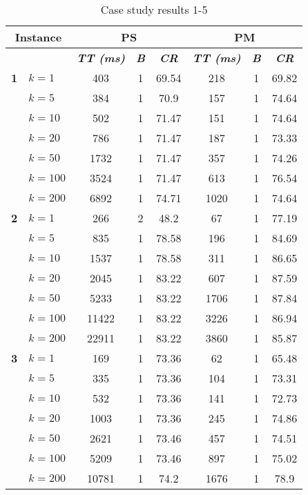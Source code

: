     \begin{table}[htbp]
    \caption{Case study results 1-5}
    \centering
    \begin{tabular}{|l|l|c|c|c|c|c|c|}
    \hline
    \multicolumn{ 2}{|c|}{\textbf{Instance}} & \multicolumn{ 3}{c|}{\textbf{PS}} & \multicolumn{ 3}{c|}{\textbf{PM}} \\ \hline
    \multicolumn{ 2}{|l|}{} & \textbf{\textit{TT (ms)}} & \textbf{\textit{B}} & \textbf{\textit{CR}} & \textbf{\textit{TT (ms)}} & \textbf{\textit{B}} & \textbf{\textit{CR}} \\ \hline
    \multicolumn{1}{|r|}{\textbf{1}} & $k=1$ & 403 & 1 & 69.54 & 218 & 1 & 69.82 \\ 
     & $k=5$ & 384 & 1 & 70.9 & 157 & 1 & 74.64 \\ 
     & $k=10$ & 502 & 1 & 71.47 & 151 & 1 & 74.64 \\ 
     & $k=20$ & 786 & 1 & 71.47 & 187 & 1 & 73.33 \\ 
     & $k=50$ & 1732 & 1 & 71.47 & 357 & 1 & 74.26 \\ 
     & $k=100$ & 3524 & 1 & 71.47 & 613 & 1 & 76.54 \\ 
     & $k=200$ & 6892 & 1 & 74.71 & 1020 & 1 & 74.64 \\ \hline
    \multicolumn{1}{|r|}{\textbf{2}} & $k=1$ & 266 & 2 & 48.2 & 67 & 1 & 77.19 \\ 
     & $k=5$ & 835 & 1 & 78.58 & 196 & 1 & 84.69 \\ 
     & $k=10$ & 1537 & 1 & 78.58 & 311 & 1 & 86.65 \\ 
     & $k=20$ & 2045 & 1 & 83.22 & 607 & 1 & 87.59 \\ 
     & $k=50$ & 5233 & 1 & 83.22 & 1706 & 1 & 87.84 \\ 
     & $k=100$ & 11422 & 1 & 83.22 & 3226 & 1 & 86.94 \\ 
     & $k=200$ & 22911 & 1 & 83.22 & 3860 & 1 & 85.87 \\ \hline
    \multicolumn{1}{|r|}{\textbf{3}} & $k=1$ & 169 & 1 & 73.36 & 62 & 1 & 65.48 \\ 
     & $k=5$ & 335 & 1 & 73.36 & 104 & 1 & 73.31 \\ 
     & $k=10$ & 532 & 1 & 73.36 & 141 & 1 & 72.73 \\ 
     & $k=20$ & 1003 & 1 & 73.36 & 245 & 1 & 74.86 \\ 
     & $k=50$ & 2621 & 1 & 73.46 & 457 & 1 & 74.51 \\ 
     & $k=100$ & 5209 & 1 & 73.46 & 897 & 1 & 75.02 \\ 
     & $k=200$ & 10781 & 1 & 74.2 & 1676 & 1 & 78.9 \\ \hline

\end{tabular}
\end{table}
